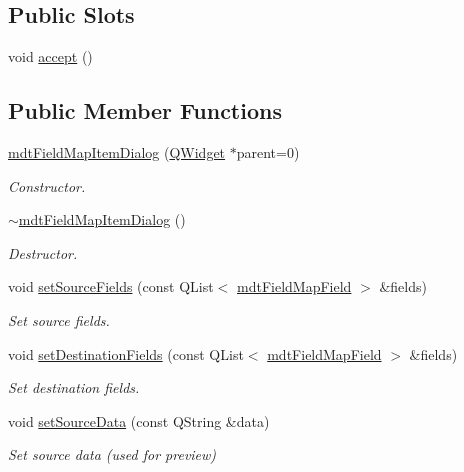 \subsection*{Public Slots}
\begin{DoxyCompactItemize}
\item 
void \hyperlink{classmdt_field_map_item_dialog_a43b775a21d170f8d801f7c493cfdcdcc}{accept} ()
\end{DoxyCompactItemize}
\subsection*{Public Member Functions}
\begin{DoxyCompactItemize}
\item 
\hyperlink{classmdt_field_map_item_dialog_ac745bae9c7ce26f72aa081bc54ac5f22}{mdt\-Field\-Map\-Item\-Dialog} (\hyperlink{class_q_widget}{Q\-Widget} $\ast$parent=0)
\begin{DoxyCompactList}\small\item\em Constructor. \end{DoxyCompactList}\item 
\hyperlink{classmdt_field_map_item_dialog_a12f195eeceb6729557a9e05835b7ca3f}{$\sim$mdt\-Field\-Map\-Item\-Dialog} ()
\begin{DoxyCompactList}\small\item\em Destructor. \end{DoxyCompactList}\item 
void \hyperlink{classmdt_field_map_item_dialog_a97e6808b1c3b3bb5748a0fcc98a439c9}{set\-Source\-Fields} (const Q\-List$<$ \hyperlink{classmdt_field_map_field}{mdt\-Field\-Map\-Field} $>$ \&fields)
\begin{DoxyCompactList}\small\item\em Set source fields. \end{DoxyCompactList}\item 
void \hyperlink{classmdt_field_map_item_dialog_a0fe47b3b9634d292936dfe4e0a4df36e}{set\-Destination\-Fields} (const Q\-List$<$ \hyperlink{classmdt_field_map_field}{mdt\-Field\-Map\-Field} $>$ \&fields)
\begin{DoxyCompactList}\small\item\em Set destination fields. \end{DoxyCompactList}\item 
void \hyperlink{classmdt_field_map_item_dialog_a0e047487ba8b45d2e1ef8bfb9f78c8a6}{set\-Source\-Data} (const Q\-String \&data)
\begin{DoxyCompactList}\small\item\em Set source data (used for preview) \end{DoxyCompactList}\item 

\end{DoxyCompactItemize}
